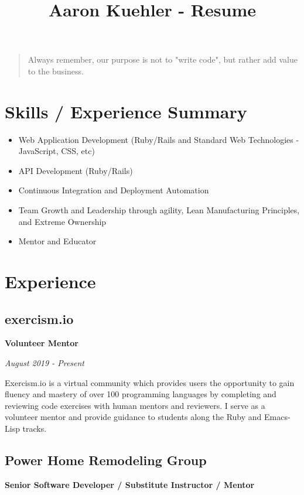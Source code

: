 \documentclass[12pt letterpaper notitlepage]{article}
\date{}
\title{Aaron Kuehler - Resume}
\begin{document}
\maketitle
\begin{quote}
Always remember, our purpose is not to "write code", but rather add value to the business.
\end{quote}

\section*{Skills / Experience Summary}
\label{sec:org9be5204}

\begin{itemize}
\item Web Application Development (Ruby/Rails and Standard Web Technologies - JavaScript, CSS, etc)
\item API Development (Ruby/Rails)
\item Continuous Integration and Deployment Automation
\item Team Growth and Leadership through agility, Lean Manufacturing Principles, and Extreme Ownership
\item Mentor and Educator
\end{itemize}

\section*{Experience}
\label{sec:orgd5c1ff3}

\subsection*{exercism.io}
\label{sec:org7db5c36}

\textbf{Volunteer Mentor}

\emph{August 2019 - Present}

Exercism.io is a virtual community which provides users the opportunity to gain fluency and mastery of over 100 programming languages by completing and reviewing code exercises with human mentors and reviewers. I serve as a volunteer mentor and provide guidance to students along the Ruby and Emacs-Lisp tracks.

\subsection*{Power Home Remodeling Group}
\label{sec:org3d29112}

\textbf{Senior Software Developer / Substitute Instructor / Mentor}
\end{document}
